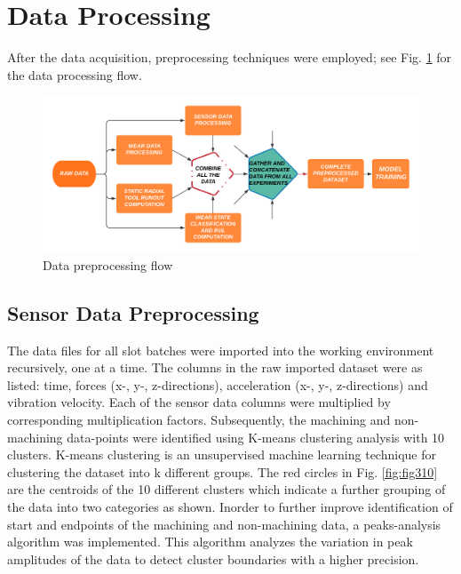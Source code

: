 \documentclass[preprint,review,12pt]{elsarticle}
\begin{document}
\section{Data Processing}\label{chap:data_pro}
After the data acquisition, preprocessing techniques were employed; see Fig. \ref{fig:fig39} for the data processing flow.

\begin{figure}[H]
\begin{center}
\includegraphics[width=\linewidth]{39.png}
\caption{Data preprocessing flow}\label{fig:fig39}
\end{center}
\end{figure}

\subsection{Sensor Data Preprocessing}\label{sec:sec41}
 The data files for all slot batches were imported into the working environment recursively, one at a time. The columns in the raw imported dataset were as listed: time, forces (x-, y-, z-directions), acceleration (x-, y-, z-directions) and vibration velocity. Each of the sensor data columns were multiplied by corresponding multiplication factors. Subsequently, the machining and non-machining data-points were identified using K-means clustering analysis with 10 clusters. K-means clustering is an unsupervised machine learning technique for clustering the dataset into k different groups. The red circles in Fig. \ref{fig:fig310} are the centroids of the 10 different clusters which indicate a further grouping of the data into two categories as shown. Inorder to further improve identification of start and endpoints of the machining and non-machining data, a peaks-analysis algorithm was implemented. This algorithm analyzes the variation in peak amplitudes of the data to detect cluster boundaries with a higher precision. \par
\end{document}
